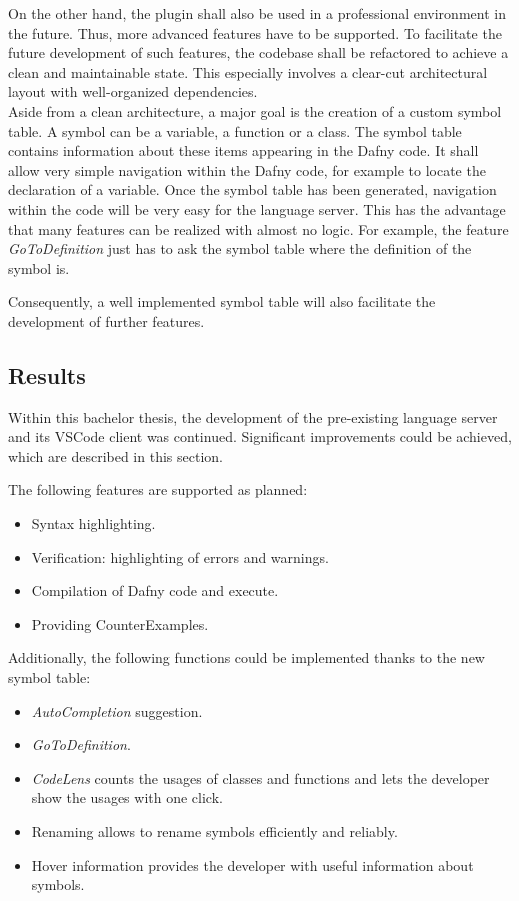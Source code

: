 On the other hand, the plugin shall also be used in a professional environment in the future.
Thus, more advanced features have to be supported.
To facilitate the future development of such features, the codebase shall be refactored to achieve a clean and maintainable state.
This especially involves a clear-cut architectural layout with well-organized dependencies.\\

Aside from a clean architecture, a major goal is the creation of a custom symbol table.
A symbol can be a variable, a function or a class.
The symbol table contains information about these items appearing in the Dafny code.
It shall allow very simple navigation within the Dafny code, for example to locate the declaration of a variable.
Once the symbol table has been generated, navigation within the code will be very easy for the language server.
This has the advantage that many features can be realized with almost no logic.
For example, the feature \textit{\textit{GoToDefinition}} just has to ask the symbol table where the definition of the symbol is.

Consequently, a well implemented symbol table will also facilitate the development of further features.

\subsection{Results}
Within this bachelor thesis, the development of the pre-existing language server and its VSCode client was continued.
Significant improvements could be achieved, which are described in this section.

The following features are supported as planned:
\begin{itemize}
    \item Syntax highlighting.
    \item Verification: highlighting of errors and warnings.
    \item Compilation of Dafny code and execute.
    \item Providing CounterExamples.
\end{itemize}

Additionally, the following functions could be implemented thanks to the new symbol table:
\begin{itemize}
    \item \textit{AutoCompletion} suggestion.
    \item \textit{GoToDefinition}.
    \item \textit{CodeLens} counts the usages of classes and functions and lets the developer show the usages with one click.
    \item Renaming allows to rename symbols efficiently and reliably.
    \item Hover information provides the developer with useful information about symbols.
\end{itemize}

